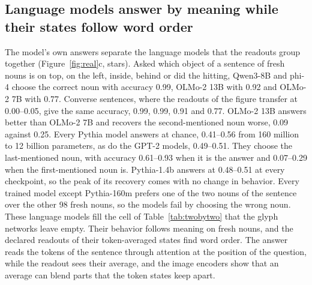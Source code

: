 \documentclass[10pt]{article}
\theoremstyle{plain}
\theoremstyle{remark}
\begin{document}
\subsection{Language models answer by meaning while their states follow word order}
\label{sec:behavior}

The model's own answers separate the language models that the readouts group together (Figure~\ref{fig:real}c, stars). Asked which object of a sentence of fresh nouns is on top, on the left, inside, behind or did the hitting, Qwen3-8B and phi-4 choose the correct noun with accuracy 0.99, OLMo-2 13B with 0.92 and OLMo-2 7B with 0.77. Converse sentences, where the readouts of the figure transfer at 0.00--0.05, give the same accuracy, 0.99, 0.99, 0.91 and 0.77. OLMo-2 13B answers better than OLMo-2 7B and recovers the second-mentioned noun worse, 0.09 against 0.25. Every Pythia model answers at chance, 0.41--0.56 from 160 million to 12 billion parameters, as do the GPT-2 models, 0.49--0.51. They choose the last-mentioned noun, with accuracy 0.61--0.93 when it is the answer and 0.07--0.29 when the first-mentioned noun is. Pythia-1.4b answers at 0.48--0.51 at every checkpoint, so the peak of its recovery comes with no change in behavior. Every trained model except Pythia-160m prefers one of the two nouns of the sentence over the other 98 fresh nouns, so the models fail by choosing the wrong noun. These language models fill the cell of Table~\ref{tab:twobytwo} that the glyph networks leave empty. Their behavior follows meaning on fresh nouns, and the declared readouts of their token-averaged states find word order. The answer reads the tokens of the sentence through attention at the position of the question, while the readout sees their average, and the image encoders show that an average can blend parts that the token states keep apart.
\end{document}
